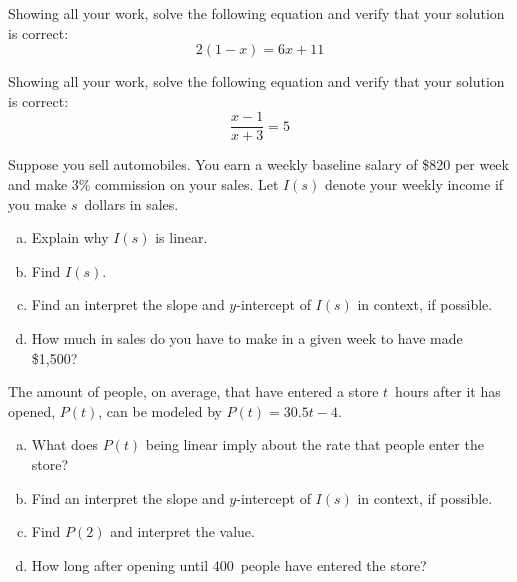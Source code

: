 \documentclass[11pt,letterpaper]{article}
\begin{document}
 Showing all your work, solve the following equation and verify that your solution is correct:
	\[
	2(1 - x)= 6x + 11
	\]



\newpage



 Showing all your work, solve the following equation and verify that your solution is correct:
	\[
	\dfrac{x - 1}{x + 3}= 5
	\]



\newpage



 Suppose you sell automobiles. You earn a weekly baseline salary of \$820 per week and make 3\% commission on your sales. Let $I(s)$ denote your weekly income if you make $s$~dollars in sales. 
	\begin{enumerate}[(a)]
	\item Explain why $I(s)$ is linear. 
	\item Find $I(s)$.
	\item Find an interpret the slope and $y$-intercept of $I(s)$ in context, if possible. 
	\item How much in sales do you have to make in a given week to have made \$1,500?
	\end{enumerate}



\newpage



 The amount of people, on average, that have entered a store $t$~hours after it has opened, $P(t)$, can be modeled by $P(t)= 30.5t - 4$. 
	\begin{enumerate}[(a)]
	\item What does $P(t)$ being linear imply about the rate that people enter the store?
	\item Find an interpret the slope and $y$-intercept of $I(s)$ in context, if possible.
	\item Find $P(2)$ and interpret the value. 
	\item How long after opening until 400~people have entered the store? 
	\end{enumerate}
\end{document}
